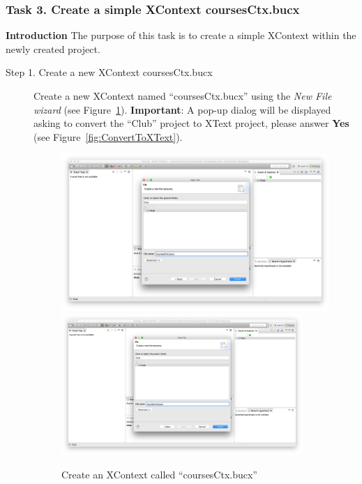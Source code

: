 \subsubsection{Task 3. Create a simple XContext coursesCtx.bucx}
\textbf{Introduction} The purpose of this task is to create a simple XContext within the newly created project.
\begin{description}
\item[Step 1. Create a new XContext coursesCtx.bucx] Create a new XContext named ``coursesCtx.bucx'' using the \emph{New File wizard} (see Figure~\ref{fig:CreateCoursesCtx}).
         \textbf{Important}: A pop-up dialog will be displayed asking to convert the ``Club''
         project to XText project, please answer \textbf{Yes} (see Figure~\ref{fig:ConvertToXText}).
\begin{figure}[!htbp]
  \centering
  \ifplastex
  \includegraphics[width=512]{figures/CreateCoursesCtx}
  \else
  \includegraphics[width=0.9\textwidth]{figures/CreateCoursesCtx}
  \fi
  \caption{Create an XContext called ``coursesCtx.bucx''}
  \label{fig:CreateCoursesCtx}
\end{figure}
\begin{figure}[!htbp]

\end{figure}
\end{description}
